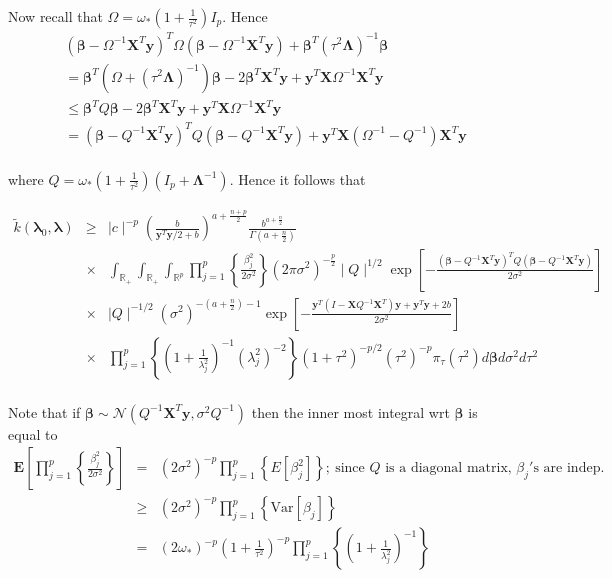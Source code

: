 \documentclass[noinfoline,11pt]{imsart}
\numberwithin{equation}{section}
\theoremstyle{plain}
\newcommand{\y}{\mathbf{y}}
\newcommand{\X}{\mathbf{X}}
\newcommand{\bb}{\boldsymbol{\beta}}
\newcommand{\bl}{\boldsymbol{\lambda}}
\newcommand{\Bl}{\boldsymbol{\Lambda}}
\newcommand{\E}{\boldsymbol{E}}
\begin{document}
\noindent
Now recall that $\Omega=\omega_*\left(1+\frac{1}{\tau^2}\right)I_p$. Hence 
\begin{eqnarray*}
& \left(\boldsymbol{\beta}-\Omega^{-1}\X^T\y\right)^T \Omega\left(\boldsymbol{\beta}-\Omega^{-1}\X^T\y\right)+\boldsymbol{\beta}^T\left(\tau^2\Bl\right)^{-1}\boldsymbol{\beta} \\
&= \boldsymbol{\beta}^T\left(\Omega+\left(\tau^2\Bl\right)^{-1}\right)\boldsymbol{\beta}-2\boldsymbol{\beta}^T\X^T\y+\y^T\X \Omega^{-1}\X^T\y\nonumber \\
&\leq \boldsymbol{\beta}^T Q\boldsymbol{\beta}-2\boldsymbol{\beta}^T\X^T\y+\y^T\X \Omega^{-1}\X^T\y\nonumber \\
&= \left(\boldsymbol{\beta}-Q^{-1}\X^T\y\right)^T Q\left(\boldsymbol{\beta}-Q^{-1}\X^T\y\right)+\y^T\X\left(\Omega^{-1}- Q^{-1}\right)\X^T\y\nonumber \\
\end{eqnarray*}

\noindent

where $Q=\omega_*\left(1+\frac{1}{\tau^2}\right)\left(I_p+\Bl^{-1}\right).$ Hence it follows that

\begin{eqnarray*}
\tilde k\left(\bl_0,\bl\right) &\geq&
\mid c\mid ^{-p}\left(\frac{b}{\y^T\y/2+b}\right)^{a+\frac{n+p}{2}}\frac{b^{a+\frac{n}{2}}}{\Gamma\left(a+\frac{n}{2}\right)} \nonumber \\
&\times& \int_{\mathbb{R}_+}\int_{\mathbb{R}_+}\int_{\mathbb{R}^p}\prod_{j=1}^p\left\{\frac{\beta_j^2}{2\sigma^2}\right\}\left(2\pi\sigma^2\right)^{-\frac{p}{2}}\mid Q\mid ^{1/2}\exp{\left[-\frac{\left(\boldsymbol{\beta}-Q^{-1}\X^T\y\right)^T Q\left(\boldsymbol{\beta}-Q^{-1}\X^T\y\right)}{2\sigma^2}\right]}\nonumber \\
&\times& \mid Q\mid ^{-1/2}\left(\sigma^2\right)^{-\left(a+\frac{n}{2}\right)-1}\exp{\left[-\frac{\y^T\left(I-\X Q^{-1}\X^T\right)\y+\y^T\y+2b}{2\sigma^2}\right]} \nonumber \\&\times& \prod_{j=1}^p\left\{\left(1+\frac{1}{\lambda_j^2}\right)^{-1}\left(\lambda_j^2\right)^{-2}\right\}\left(1+\tau^2\right)^{-p/2}\left(\tau^2\right)^{-p}\pi_\tau\left(\tau^2\right)d\boldsymbol{\beta}d\sigma^2d\tau^2\nonumber \\
\end{eqnarray*}

\noindent
Note that if $\bb\sim \mathcal{N}\left(Q^{-1}\X^T\y,\sigma^2Q^{-1}\right)$ then the inner most integral wrt $\bb$ is equal to 
\begin{eqnarray*}
    \E\left[\prod\limits_{j=1}^p\left\{\frac{\beta_j^2}{2\sigma^2}\right\}\right] &=& \left(2\sigma^2\right)^{-p}\prod\limits_{j=1}^p\left\{ E\left[\beta_j^2\right]\right\};\ \text{since $Q$ is a diagonal matrix, $\beta_j'$s are indep.}\nonumber \\
    &\geq& \left(2\sigma^2\right)^{-p}\prod\limits_{j=1}^p\left\{ \text{Var}\left[\beta_j\right]\right\} \nonumber \\
    &=& \left(2\omega_*\right)^{-p}\left(1+\frac{1}{\tau^2}\right)^{-p}\prod\limits_{j=1}^p\left\{\left(1+\frac{1}{\lambda_j^2}\right)^{-1}\right\} \nonumber \\
\end{eqnarray*} 
\end{document}
